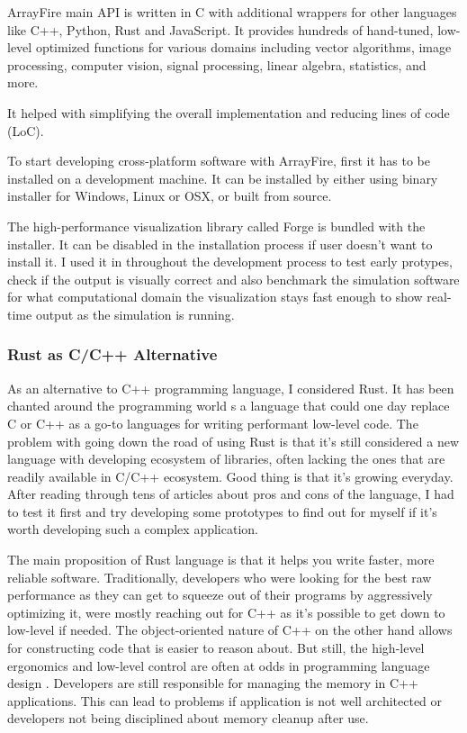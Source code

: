 ArrayFire main API is written in C with additional wrappers for other languages like C++, Python, Rust and JavaScript. It provides hundreds of hand-tuned, low-level optimized functions for various domains including vector algorithms, image processing, computer vision, signal processing, linear algebra, statistics, and more.

It helped with simplifying the overall implementation and reducing lines of code (LoC).

To start developing cross-platform software with ArrayFire, first it has to be installed on a development machine. It can be installed by either using binary installer for Windows, Linux or OSX, or built from source.

The high-performance visualization library called Forge is bundled with the installer. It can be disabled in the installation process if user doesn't want to install it. I used it in throughout the development process to test early protypes, check if the output is visually correct and also benchmark the simulation software for what computational domain the visualization stays fast enough to show real-time output as the simulation is running.



\subsubsection{Rust as C/C++ Alternative} \label{sec:rust-alt}

 As an alternative to C++ programming language, I considered Rust. It has been chanted around the programming world s a language that could one day replace C or C++ as a go-to languages for writing performant low-level code. The problem with going down the road of using Rust is that it's still considered a new language with developing ecosystem of libraries, often lacking the ones that are readily available in C/C++ ecosystem. Good thing is that it's growing everyday. After reading through tens of articles about pros and cons of the language, I had to test it first and try developing some prototypes to find out for myself if it's worth developing such a complex application.

The main proposition of Rust language is that it helps you write faster, more reliable software. Traditionally, developers who were looking for the best raw performance as they can get to squeeze out of their programs by aggressively optimizing it, were mostly reaching out for C++ as it's possible to get down to low-level if needed. The object-oriented nature of C++ on the other hand allows for constructing code that is easier to reason about. But still, the high-level ergonomics and low-level control are often at odds in programming language design \cite{steveklabnik2018}. Developers are still responsible for managing the memory in C++ applications. This can lead to problems if application is not well architected or developers not being disciplined about memory cleanup after use.

